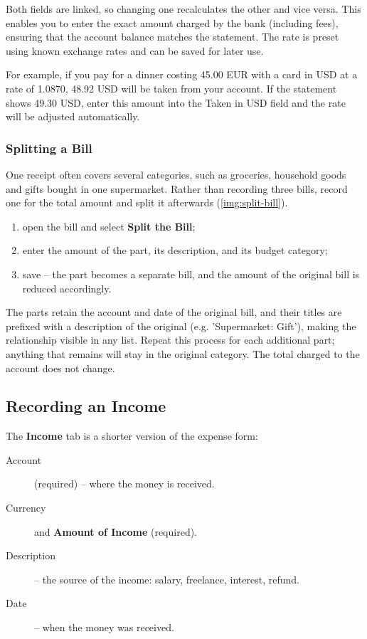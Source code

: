 \noindent Both fields are linked, so changing one recalculates the other and vice versa. This
enables you to enter the exact amount charged by the bank (including fees), ensuring that
the account balance matches the statement. The rate is preset using known exchange rates and
can be saved for later use.

For example, if you pay for a dinner costing 45.00 EUR with a card in USD at a rate of
1.0870, 48.92 USD will be taken from your account. If the statement shows 49.30 USD, enter
this amount into the Taken in USD field and the rate will be adjusted automatically.


\subsubsection{Splitting a Bill}

One receipt often covers several categories, such as groceries, household goods and gifts
bought in one supermarket. Rather than recording three bills, record one for the total amount
and split it afterwards (\cref{img:split-bill}).

\begin{enumerate}
  \item open the bill and select \textbf{Split the Bill};
  \item enter the amount of the part, its description, and its budget category;
  \item save -- the part becomes a separate bill, and the amount of the original bill is
  reduced accordingly.
\end{enumerate}

\noindent The parts retain the account and date of the original bill, and their titles are
prefixed with a description of the original (e.g. 'Supermarket: Gift'), making the
relationship visible in any list. Repeat this process for each additional part; anything that
remains will stay in the original category. The total charged to the account does not change.


\subsection{Recording an Income}

The \textbf{Income} tab is a shorter version of the expense form:

\begin{description}
  \item[Account] (required) -- where the money is received.
  \item[Currency] and \textbf{Amount of Income} (required).
  \item[Description] -- the source of the income: salary, freelance, interest, refund.
  \item[Date] -- when the money was received.
\end{description}

